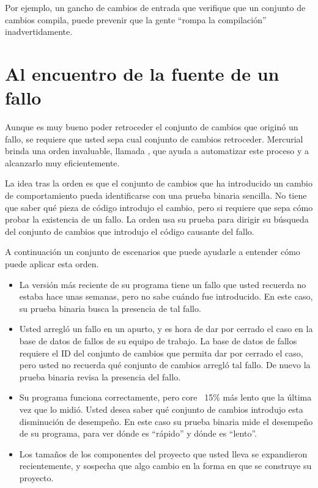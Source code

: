 Por ejemplo, un gancho de cambios de entrada que verifique que un
conjunto de cambios compila, puede prevenir que la gente ``rompa 
la compilación'' inadvertidamente.

\section{Al encuentro de la fuente de un fallo}
\label{sec:undo:bisect}

Aunque es muy bueno poder retroceder el conjunto de cambios que
originó un fallo, se requiere que usted sepa cual conjunto de cambios
retroceder.  Mercurial brinda una orden invaluable, llamada
, que ayuda a automatizar este proceso y a alcanzarlo
muy eficientemente.

La idea tras la orden  es que el conjunto de cambios que
ha introducido un cambio de comportamiento pueda identificarse con una
prueba binaria sencilla. No tiene que saber qué pieza de código
introdujo el cambio, pero si requiere que sepa cómo probar la
existencia de un fallo. La orden  usa su prueba para
dirigir su búsqueda del conjunto de cambios que introdujo el código
causante del fallo.

A continuación un conjunto de escenarios que puede ayudarle a entender
cómo puede aplicar esta orden.
\begin{itemize}
\item La versión más reciente de su programa tiene un fallo que usted
  recuerda no estaba hace unas semanas, pero no sabe cuándo fue
  introducido. En este caso, su prueba binaria busca la presencia de
  tal fallo.
\item Usted arregló un fallo en un apurto, y es hora de dar por
  cerrado el caso en la base de datos de fallos de su equipo de
  trabajo.   La base de datos de fallos requiere el ID del conjunto de
  cambios que permita dar por cerrado el caso, pero usted no recuerda
  qué conjunto de cambios arregló tal fallo.  De nuevo la prueba
  binaria revisa la presencia del fallo.
\item Su programa funciona correctamente, pero  core ~15\% más lento
  que la última vez que lo midió. Usted desea saber qué conjunto de
  cambios introdujo esta disminución de desempeño.  En este caso su
  prueba binaria mide el desempeño de su programa, para ver dónde es
  ``rápido'' y dónde es ``lento''.
\item Los tamaños de los componentes del proyecto que usted lleva se
  expandieron recientemente, y sospecha que algo cambio en la forma en
  que se construye su proyecto.
\end{itemize}

